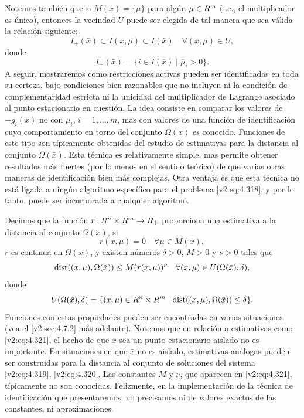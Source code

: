 Notemos también que si $M(\bar{x}) = \{\bar{\mu}\}$ para algún $\bar{\mu} \in R^m$ (i.e., el multiplicador es único), entonces la vecindad $U$ puede ser elegida de tal manera que sea válida la relación siguiente:
\[
    I_+(\bar{x}) \subset I(x, \mu) \subset I(\bar{x}) \quad \forall (x, \mu) \in U,
\]
donde
\[
    I_+(\bar{x}) = \{i \in I(\bar{x}) \mid \bar{\mu}_i > 0\}.
\]
A seguir, mostraremos como restricciones activas pueden ser identificadas en toda su certeza, bajo condiciones bien razonables que no incluyen ni la condición de complementaridad estricta ni la unicidad del multiplicador de Lagrange asociado al punto estacionario en cuestión. La idea consiste en comparar los valores de $-g_i(x)$ no con $\mu_i$, $i = 1, \dots, m$, mas con valores de una función de identificación cuyo comportamiento en torno del conjunto $\Omega(\bar{x})$ es conocido. Funciones de este tipo son típicamente obtenidas del estudio de estimativas para la distancia al conjunto $\Omega(\bar{x})$. Esta técnica es relativamente simple, mas permite obtener resultados más fuertes (por lo menos en el sentido teórico) de que varias otras maneras de identificación bien más complejas.
Otra ventaja es que esta técnica no está ligada a ningún algoritmo específico para el problema \eqref{v2:eq:4.318}, y por lo tanto, puede ser incorporada a cualquier algoritmo.

Decimos que la función $r \colon R^n \times R^m \to R_+$ proporciona una estimativa a la distancia al conjunto $\Omega(\bar{x})$, si
\[
    r(\bar{x}, \bar{\mu}) = 0 \quad \forall \bar{\mu} \in M(\bar{x}),
\]
$r$ es continua en $\Omega(\bar{x})$, y existen números $\delta > 0$, $M > 0$ y $\nu > 0$ tales que
\begin{equation}
    \operatorname{dist}((x, \mu), \Omega(\bar{x})) \le M(r(x, \mu))^\nu \quad \forall (x, \mu) \in U(\Omega(\bar{x}), \delta),
    \label{v2:eq:4.321}
\end{equation}
donde
\[
    U(\Omega(\bar{x}), \delta) = \{(x, \mu) \in R^n \times R^m \mid \operatorname{dist}((x, \mu), \Omega(\bar{x})) \le \delta\}.
\]
Funciones con estas propiedades pueden ser encontradas en varias situaciones (vea el \cref{v2:sec:4.7.2} más adelante). Notemos que en relación a estimativas como \eqref{v2:eq:4.321}, el hecho de que $\bar{x}$ sea un punto estacionario aislado no es importante. En situaciones en que $\bar{x}$ no es aislado, estimativas análogas pueden ser construidas para la distancia al conjunto de soluciones del sistema \eqref{v2:eq:4.319}, \eqref{v2:eq:4.320}. Las constantes $M$ y $\nu$, que aparecen en \eqref{v2:eq:4.321}, típicamente no son conocidas. Felizmente, en la implementación de la técnica de identificación que presentaremos, no precisamos ni de valores exactos de las constantes, ni aproximaciones.

